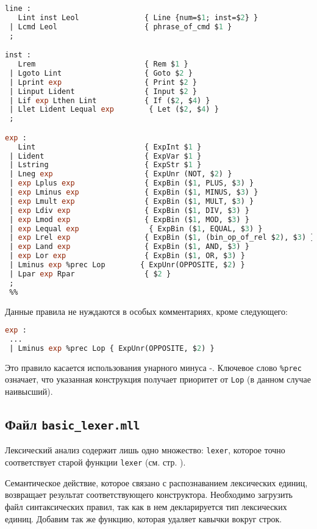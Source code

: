 \begin{lstlisting}[language=OCaml]
 %%
line :
   Lint inst Leol               { Line {num=$1; inst=$2} }
 | Lcmd Leol                    { phrase_of_cmd $1 }
 ;

inst :
   Lrem                         { Rem $1 }
 | Lgoto Lint                   { Goto $2 }
 | Lprint exp                   { Print $2 }
 | Linput Lident                { Input $2 }
 | Lif exp Lthen Lint           { If ($2, $4) }
 | Llet Lident Lequal exp        { Let ($2, $4) }
 ;

exp :
   Lint                         { ExpInt $1 }
 | Lident                       { ExpVar $1 }
 | Lstring                      { ExpStr $1 }
 | Lneg exp                     { ExpUnr (NOT, $2) }
 | exp Lplus exp                { ExpBin ($1, PLUS, $3) }
 | exp Lminus exp               { ExpBin ($1, MINUS, $3) }
 | exp Lmult exp                { ExpBin ($1, MULT, $3) }
 | exp Ldiv exp                 { ExpBin ($1, DIV, $3) }
 | exp Lmod exp                 { ExpBin ($1, MOD, $3) }
 | exp Lequal exp                { ExpBin ($1, EQUAL, $3) }
 | exp Lrel exp                 { ExpBin ($1, (bin_op_of_rel $2), $3) }
 | exp Land exp                 { ExpBin ($1, AND, $3) }
 | exp Lor exp                  { ExpBin ($1, OR, $3) }
 | Lminus exp %prec Lop        { ExpUnr(OPPOSITE, $2) }
 | Lpar exp Rpar                { $2 }
 ;
 %%
\end{lstlisting}

Данные правила не нуждаются в особых комментариях, кроме следующего:

\begin{lstlisting}[language=OCaml]
exp :
 ...
 | Lminus exp %prec Lop { ExpUnr(OPPOSITE, $2) }
\end{lstlisting}

Это правило касается использования унарного минуса -. Ключевое слово
\texttt{\%prec} означает, что указанная конструкция получает приоритет от
\texttt{Lop} (в данном случае наивысший).

\subsection{Файл \texttt{basic\_lexer.mll}}

Лексический анализ содержит лишь одно множество: \texttt{lexer}, которое точно
соответствует старой функции \texttt{lexer} (см. стр. \pageref{??}).

Семантическое действие, которое связано с распознаванием лексических единиц,
возвращает результат соответствующего конструктора. Необходимо загрузить файл
синтаксических правил, так как в нем декларируется тип лексических единиц.
Добавим так же функцию, которая удаляет кавычки вокруг строк.

